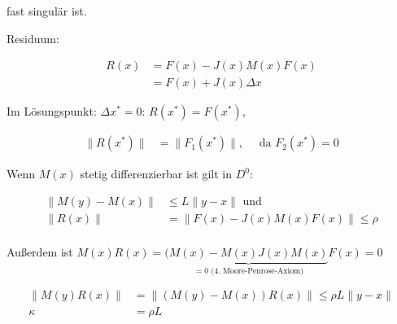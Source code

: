 fast singulär ist.

Residuum:

\begin{align*}
R(x) &= F(x) - J(x) M(x) F(x) \\
&= F(x) + J(x)\Delta x
\end{align*}

Im Lösungspunkt: $\Delta x^* = 0$: $R(x^*) = F(x^*)$,

\begin{align*}
\| R(x^*) \| &= \| F_1(x^*) \|, \quad \text{ da } F_2(x^*) = 0
\end{align*}


Wenn $M(x)$ stetig differenzierbar ist gilt in $D^0$:

\begin{align*}
\|M(y) - M(x)\| & \leq L \|y-x\| \text{ und } \\
\|R(x)\| &= \|F(x) - J(x)M(x) F(x) \| \leq \rho \\
\end{align*}

Außerdem ist $M(x) R(x) = (\underbrace{M(x) - M(x)J(x) M(x)}_{= 0 \text{ (4. Moore-Penrose-Axiom)}} F(x) = 0$

\begin{align*}
\| M(y) R(x) \| &= \| (M(y)-M(x)) R(x) \| \leq \rho L \|y-x\| \\
\kappa &= \rho L 
\end{align*}
























































